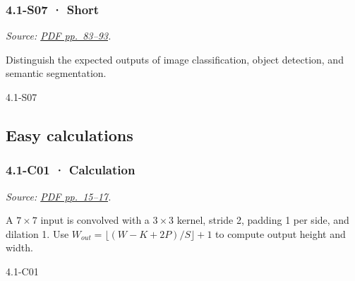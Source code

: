 \noindent\begin{minipage}{\linewidth}

\subsubsection{4.1-S07 · Short}\label{s07-short-11}

\emph{Source: \href{../Lecture\%20Slides/4.1.\%20CNNs.pdf\#page=83}{PDF
pp.~83--93}.}

Distinguish the expected outputs of image classification, object
detection, and semantic segmentation.

\begin{solution}[20mm]{4.1-S07}

\end{solution}
\end{minipage}\par\medskip

\subsection{Easy calculations}\label{easy-calculations-11}

\noindent\begin{minipage}{\linewidth}

\subsubsection{4.1-C01 · Calculation}\label{c01-calculation-11}

\emph{Source: \href{../Lecture\%20Slides/4.1.\%20CNNs.pdf\#page=15}{PDF
pp.~15--17}.}

A \(7\times7\) input is convolved with a \(3\times3\) kernel, stride 2,
padding 1 per side, and dilation 1. Use
\(W_{out}=\lfloor(W-K+2P)/S\rfloor+1\) to compute output height and
width.

\begin{solution}[26mm]{4.1-C01}

\end{solution}
\end{minipage}\par\medskip

